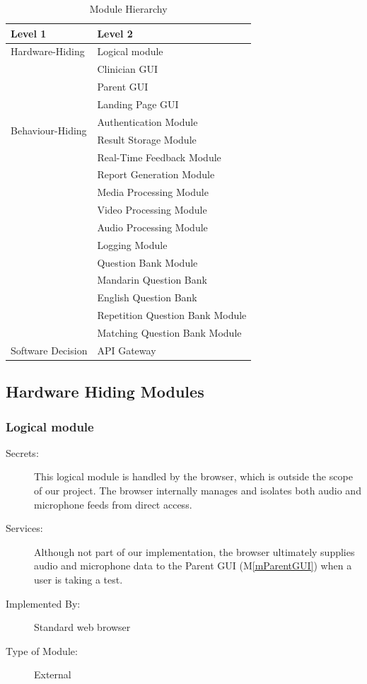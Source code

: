 \documentclass[12pt, titlepage]{article}
\newcommand{\mref}[1]{M\ref{#1}}
\begin{document}
\begin{table}[h!]
  \centering
  \begin{tabular}{p{} p{}}
  \toprule
  \textbf{Level 1} & \textbf{Level 2}\\
  \midrule
  
  {Hardware-Hiding} & Logical module \\
  \midrule
  
  \multirow{8}{0.3\textwidth}{Behaviour-Hiding} & Clinician GUI\\
  & Parent GUI\\
  & Landing Page GUI\\
  & Authentication Module\\
  & Result Storage Module\\
  & Real-Time Feedback Module\\ 
  & Report Generation Module\\
  & Media Processing Module\\
  & Video Processing Module\\
  & Audio Processing Module\\
  & Logging Module\\
  & Question Bank Module\\
  & Mandarin Question Bank\\
  & English Question Bank\\
  & Repetition Question Bank Module\\
  & Matching Question Bank Module\\
  \midrule
  
  \multirow{1}{0.3\textwidth}{Software Decision} & API Gateway\\
  \bottomrule
  
  \end{tabular}
  \caption{Module Hierarchy}
  \label{TblMH}
  \end{table}
  \newpage

\subsection{Hardware Hiding Modules}
 \subsubsection{Logical module}
\begin{description}
  \item[Secrets:]
    This logical module is handled by the browser, which is outside the scope of our project.
    The browser internally manages and isolates both audio and microphone feeds from direct access.
  \item[Services:]
    Although not part of our implementation, the browser ultimately supplies audio and microphone data
    to the Parent GUI (\mref{mParentGUI}) when a user is taking a test.
  \item[Implemented By:]
    Standard web browser
  \item[Type of Module:]
    External 
\end{description}
\end{document}
